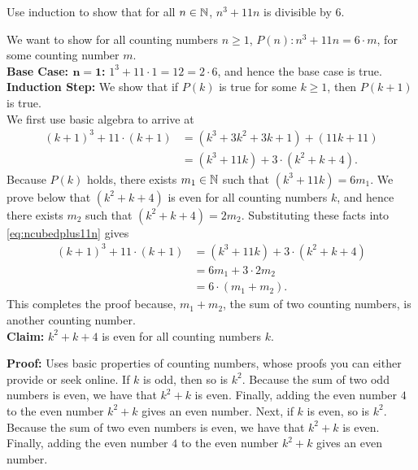 \begin{exercise} 
Use induction to show that for all $n\in \mathbb N$,  $n^3 +11n$ is divisible by 6.
    
\end{exercise}

\solution We want to show for all counting numbers $n\ge 1$,
 $P(n): n^3 + 11n = 6 \cdot m$, for some counting number $m$. \\

 \textbf{Base Case: $\bm{n=1}$:} $1^3 + 11\cdot 1 = 12 = 2 \cdot 6$, and hence the base case is true.\\

 \textbf{Induction Step:} We show that if $P(k)$ is true for some $k\ge 1$, then $P(k+1)$ is true. \\

 We first use basic algebra to arrive at 
 \begin{equation}
 \label{eq:ncubedplus11n}
     \begin{aligned}
         (k+1)^3 + 11 \cdot (k+1) & = \left(  k^3 + 3 k^2 + 3 k + 1\right) + \left( 11 k + 11 \right) \\
         & = \left( k^3 + 11 k\right) + 3 \cdot \left( k^2 + k + 4\right) .
     \end{aligned}
 \end{equation}
 Because $P(k)$ holds, there exists $m_1 \in \mathbb N$ such that 
 $ \left( k^3 + 11 k\right) = 6 m_1$. We prove below that $\left( k^2 + k + 4\right)$ is even for all counting numbers $k$, and hence there exists $m_2$ such that $\left( k^2 + k + 4\right) = 2 m_2$. Substituting these facts into \eqref{eq:ncubedplus11n} gives
\begin{align*}
         (k+1)^3 + 11 \cdot (k+1) &  = \left( k^3 + 11 k\right) + 3 \cdot \left( k^2 + k + 4\right) \\
         & = 6 m_1 + 3 \cdot 2 m_2 \\
         & = 6 \cdot \left( m_1 + m_2\right).
 \end{align*}
 This completes the proof because, $m_1 + m_2$, the sum of two counting numbers, is another counting number.\\

 \textbf{Claim:} $k^2 + k + 4$ is even for all counting numbers $k$.

 \textbf{Proof:}  Uses basic properties of counting numbers, whose proofs you can either provide or seek online. If $k$ is odd, then so is $k^2$. Because the sum of two odd numbers is even, we have that $k^2+k$ is even. Finally, adding the even number $4$ to the even number $k^2+k$ gives an even number.  Next, if $k$ is even, so is $k^2$. Because the sum of two even numbers is even, we have that $k^2+k$ is even. Finally, adding the even number $4$ to the even number $k^2+k$ gives an even number.\\

